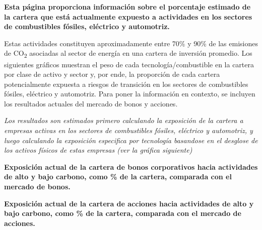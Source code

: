 \documentclass[10pt,table]{article}\usepackage[]{graphicx}\usepackage[]{color}
\begin{document}
	\begin{multicols}{2}
		
		\textbf{Esta página proporciona información sobre el porcentaje estimado de la cartera que está actualmente expuesto a actividades en los sectores de combustibles fósiles, eléctrico y automotriz.}
		
		Estas actividades constituyen aproximadamente entre 70\% y 90\% de las emisiones de CO\textsubscript{2} asociadas al sector de energía en una cartera de inversión promedio. Los siguientes gráficos muestran el peso de cada tecnología/combustible en la cartera por clase de activo y sector y, por ende, la proporción de cada cartera potencialmente expuesta a riesgos de transición en los sectores de combustibles fósiles, eléctrico y automotriz. Para poner la información en contexto, se incluyen los resultados actuales del mercado de bonos y acciones.
		
		
		\textit{Los resultados son estimados primero calculando la exposición de la cartera a empresas activas en los sectores de combustibles fósiles, eléctrico y automotriz, y luego calculando la exposición especifica por tecnología basandose en el desglose de los activos físicos de estas empresas (ver la gráfica siguiente) }
		
		\vspace{-0.1cm}
		
	\end{multicols}
	
	\vspace{-0.7cm}
	
	\textbf{Exposición actual de la cartera de bonos corporativos hacia actividades de alto y bajo carbono, como \% de la cartera, comparada con el mercado de bonos.} 
	
	\vspace{-0.2cm}
	
	
	\textbf{Exposición actual de la cartera de acciones hacia actividades de alto y bajo carbono, como \% de la cartera, comparada con el mercado de acciones.} 
	
	\vspace{-0.2cm}
	
	
\end{document}
